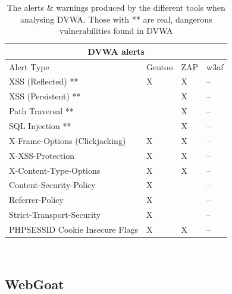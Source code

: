 \begin{table}[h]
	
	{
		
		\captionsetup{justification=centering}
		
		\caption{The alerts \& warnings produced by the different tools when analysing DVWA. Those with ** are real, dangerous vulnerabilities found in DVWA}
		\label{table:dvwa_alerts}
		\begin{tabular}{ |p{7cm}|>{\centering\arraybackslash}m{2cm} |>{\centering\arraybackslash}m{2cm} |>{\centering\arraybackslash}m{2cm}| }
			\hline
			\multicolumn{4}{|c|}{\textbf{DVWA alerts}} \\ [0.5ex]
			\hline \hline 
			Alert Type & Gentoo & ZAP & w3af \\
			\hline
			XSS (Reflected) ** & X & X & --\\
			XSS (Persistent) ** &  & X & --\\
			Path Traversal ** &  & X & --\\
			SQL Injection **& & X & --\\
			X-Frame-Options (Clickjacking) & X & X & -- \\
			X-XSS-Protection & X & X & --\\
			X-Content-Type-Options& X & X &-- \\
			Content-Security-Policy & X & &-- \\
			Referrer-Policy & X & & --\\
			Strict-Transport-Security & X  & & --\\
			PHPSESSID Cookie Insecure Flags & X & X & -- \\
			\hline
		\end{tabular}
	} \\
\end{table}



\subsection{WebGoat}


